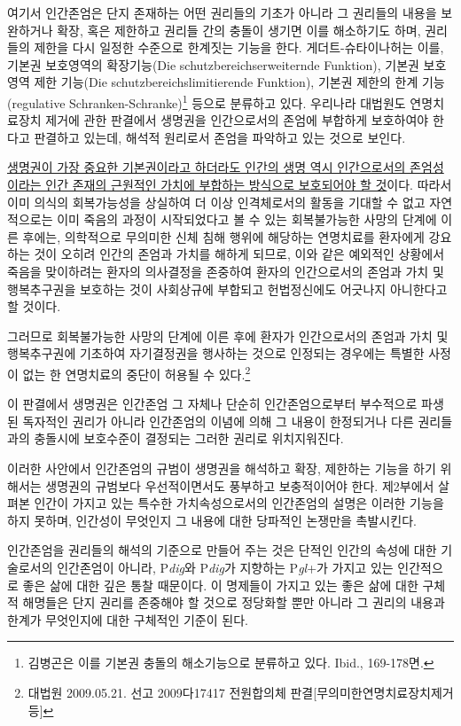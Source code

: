 여기서 인간존엄은 단지 존재하는 어떤 권리들의 기초가 아니라 그 권리들의 내용을 보완하거나 확장, 혹은 제한하고 권리들 간의 충돌이 생기면 이를 해소하기도 하며, 권리들의 제한을 다시 일정한 수준으로 한계짓는 기능을 한다. 게더트-슈타이나허는 이를, 기본권 보호영역의 확장기능(Die schutzbereichserweiternde Funktion), 기본권 보호영역 제한 기능(Die schutzbereichslimitierende Funktion), 기본권 제한의 한계 기능(regulative Schranken-Schranke)\footnote{김병곤은 이를 기본권 충돌의 해소기능으로 분류하고 있다. Ibid., 169-178면.} 등으로 분류하고 있다. 우리나라 대법원도 연명치료장치 제거에 관한 판결에서 생명권을 인간으로서의 존엄에 부합하게 보호하여야 한다고 판결하고 있는데, 해석적 원리로서 존엄을 파악하고 있는 것으로 보인다.

\ul{생명권이 가장 중요한 기본권이라고 하더라도 인간의 생명 역시 인간으로서의 존엄성이라는 인간 존재의 근원적인 가치에 부합하는 방식으로 보호되어야 할 것}이다. 따라서 이미 의식의 회복가능성을 상실하여 더 이상 인격체로서의 활동을 기대할 수 없고 자연적으로는 이미 죽음의 과정이 시작되었다고 볼 수 있는 회복불가능한 사망의 단계에 이른 후에는, 의학적으로 무의미한 신체 침해 행위에 해당하는 연명치료를 환자에게 강요하는 것이 오히려 인간의 존엄과 가치를 해하게 되므로, 이와 같은 예외적인 상황에서 죽음을 맞이하려는 환자의 의사결정을 존중하여 환자의 인간으로서의 존엄과 가치 및 행복추구권을 보호하는 것이 사회상규에 부합되고 헌법정신에도 어긋나지 아니한다고 할 것이다.

그러므로 회복불가능한 사망의 단계에 이른 후에 환자가 인간으로서의 존엄과 가치 및 행복추구권에 기초하여 자기결정권을 행사하는 것으로 인정되는 경우에는 특별한 사정이 없는 한 연명치료의 중단이 허용될 수 있다.\footnote{대법원 2009.05.21. 선고 2009다17417 전원합의체 판결{[}무의미한연명치료장치제거등{]}}

이 판결에서 생명권은 인간존엄 그 자체나 단순히 인간존엄으로부터 부수적으로 파생된 독자적인 권리가 아니라 인간존엄의 이념에 의해 그 내용이 한정되거나 다른 권리들과의 충돌시에 보호수준이 결정되는 그러한 권리로 위치지워진다.

이러한 사안에서 인간존엄의 규범이 생명권을 해석하고 확장, 제한하는 기능을 하기 위해서는 생명권의 규범보다 우선적이면서도 풍부하고 보충적이어야 한다. 제2부에서 살펴본 인간이 가지고 있는 특수한 가치속성으로서의 인간존엄의 설명은 이러한 기능을 하지 못하며, 인간성이 무엇인지 그 내용에 대한 당파적인 논쟁만을 촉발시킨다.

인간존엄을 권리들의 해석의 기준으로 만들어 주는 것은 단적인 인간의 속성에 대한 기술로서의 인간존엄이 아니라, P\emph{dig}와 P\emph{dig}가 지향하는 P\emph{gl}+가 가지고 있는 인간적으로 좋은 삶에 대한 깊은 통찰 때문이다. 이 명제들이 가지고 있는 좋은 삶에 대한 구체적 해명들은 단지 권리를 존중해야 할 것으로 정당화할 뿐만 아니라 그 권리의 내용과 한계가 무엇인지에 대한 구체적인 기준이 된다.

